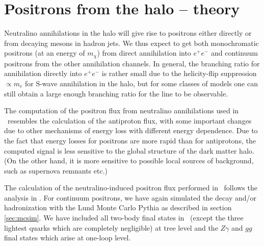 \section{Positrons from the halo -- theory}

Neutralino annihilations in the halo will give rise to positrons either
directly or from decaying mesons in hadron jets.  We thus expect to get both
monochromatic positrons (at an energy of $m_{\chi}$) from direct annihilation
into $e^{+}e^{-}$ and continuum positrons from the other annihilation
channels. In general, the branching ratio for annihilation directly into $e^+
e^-$ is rather small due to the helicity-flip suppression $\propto m_e$ for
S-wave annihilation in the halo, but for some classes of models one can still
obtain a large enough branching ratio for the line to be observable.

The computation of the positron flux from neutralino annihilations used in \ds\
resembles the calculation of the antiproton flux, with some important changes
due to other mechanisms of energy loss with different energy dependence.  Due
to the fact that energy losses for positrons are more rapid than for
antiprotons, the computed signal is less sensitive to the global structure of
the dark matter halo.  (On the other hand, it is more sensitive to possible
local sources of background, such as supernova remnants etc.)

The calculation of the neutralino-induced positron flux performed in \ds\
follows the analysis in \cite{baltz}.  For continuum positrons, we have again
simulated the decay and/or hadronization with the Lund Monte Carlo {\sc Pythia}
as described in section \ref{sec:mcsim}.
We have included all two-body final states in \ds\ (except the three lightest
quarks which are completely negligible) at tree level and the $Z\gamma$
\cite{bub} and $gg$ \cite{lp} final states which arise at one-loop level.


